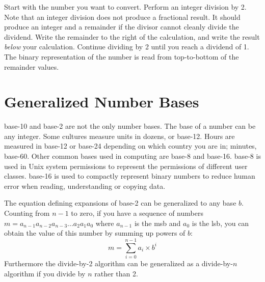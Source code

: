 Start with the number you want to convert. Perform an integer division by 2. Note that an integer division does not produce a fractional
 result. It should produce an integer and a remainder if the divisor cannot cleanly divide the dividend. Write the remainder to the 
 right of the calculation, and write the result \textit{below} your calculation. Continue dividing by 2 until you reach a dividend of 1. 
 The binary representation of the number is read from top-to-bottom of the remainder values.

\section{Generalized Number Bases\label{sec:numbers:bases}}

\Gls{base-10} and \gls{base-2} are not the only number bases. The base of a number can be any 
integer. Some cultures measure units in dozens, or base-12. Hours are measured in base-12 or 
base-24 depending on which country you are in; minutes, base-60. Other common bases used in 
computing are \gls{base-8} and \gls{base-16}. \Gls{base-8} is used in Unix system permissions 
to represent the permissions of different user classes. \Gls{base-16} is used to compactly 
represent binary numbers to reduce human error when reading, understanding or copying data.

The equation defining expansions of \gls{base-2} can be generalized to any base $b$. Counting from $n-1$ 
to zero, if you have a sequence of numbers $m = a_{n-1}a_{n-2}a_{n-3}...a_2a_1a_0$ 
where $a_{n-1}$ is the \gls{msb} and $a_0$ is the \gls{lsb}, you can obtain the value of this number 
by summing up powers of $b$:
%
\begin{equation}\label{eq:basen}
    m = \sum_{i=0}^{n-1} a_i \times b^i
\end{equation}
%
Furthermore the divide-by-2 algorithm can be generalized as a divide-by-$n$ algorithm if you divide by $n$ rather than 2.

\begin{figure}[h]
\end{figure}

